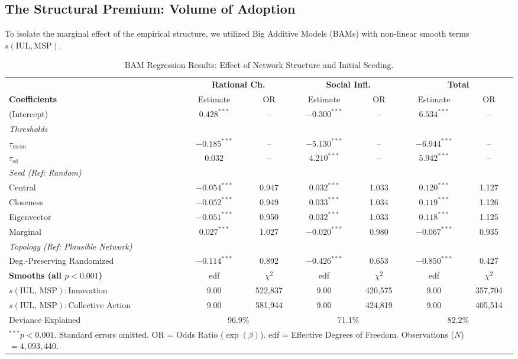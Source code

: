 \documentclass[5p,twocolumn,authoryear]{elsarticle}
\begin{document}
\subsection{The Structural Premium: Volume of Adoption}
To isolate the marginal effect of the empirical structure, we utilized Big Additive Models (BAMs) with non-linear smooth terms $s(\text{IUL}, \text{MSP})$.

\begin{table}[t]
    \centering
    \caption{BAM Regression Results: Effect of Network Structure and Initial Seeding.}
    \label{tab:bam}
    \begin{tabular}{lcccccc}
    \toprule
    & \multicolumn{2}{c}{\textbf{Rational Ch.}} & \multicolumn{2}{c}{\textbf{Social Infl.}} & \multicolumn{2}{c}{\textbf{Total}} \\
    \cmidrule(lr){2-3} \cmidrule(lr){4-5} \cmidrule(lr){6-7}
    \textbf{Coefficients} & Estimate & OR & Estimate & OR & Estimate & OR \\
    \midrule
    (Intercept) & $0.428^{***}$ & -- & $-0.300^{***}$ & -- & $6.534^{***}$ & -- \\
    \addlinespace
    \textit{Thresholds} \\
    $\tau_{\text{mean}}$ & $-0.185^{***}$ & -- & $-5.130^{***}$ & -- & $-6.944^{***}$ & -- \\
    $\tau_{\text{sd}}$ & $0.032$ & -- & $4.210^{***}$ & -- & $5.942^{***}$ & -- \\
    \addlinespace
    \textit{Seed (Ref: Random)} \\
    Central & $-0.054^{***}$ & 0.947 & $0.032^{***}$ & 1.033 & $0.120^{***}$ & 1.127 \\
    Closeness & $-0.052^{***}$ & 0.949 & $0.033^{***}$ & 1.034 & $0.119^{***}$ & 1.126 \\
    Eigenvector & $-0.051^{***}$ & 0.950 & $0.032^{***}$ & 1.033 & $0.118^{***}$ & 1.125 \\
    Marginal & $0.027^{***}$ & 1.027 & $-0.020^{***}$ & 0.980 & $-0.067^{***}$ & 0.935 \\
    \addlinespace
    \textit{Topology (Ref: Plausible Network)} \\
    Deg.-Preserving Randomized & $-0.114^{***}$ & 0.892 & $-0.426^{***}$ & 0.653 & $\mathbf{-0.850}^{***}$ & 0.427 \\
    \midrule
    \textbf{Smooths (all $p < 0.001$)} & edf & $\chi^2$ & edf & $\chi^2$ & edf & $\chi^2$ \\
    \midrule
    $s(\text{IUL, MSP}):\text{Innovation}$ & 9.00 & 522,837 & 9.00 & 420,575 & 9.00 & 357,704 \\
    $s(\text{IUL, MSP}):\text{Collective Action}$ & 9.00 & 581,944 & 9.00 & 424,819 & 9.00 & 405,514 \\
    \midrule
    Deviance Explained & \multicolumn{2}{c}{96.9\%} & \multicolumn{2}{c}{71.1\%} & \multicolumn{2}{c}{82.2\%} \\
    \bottomrule
    \multicolumn{7}{l}{\footnotesize $^{***} p < 0.001$. Standard errors omitted. OR = Odds Ratio ($\exp(\beta)$). edf = Effective Degrees of Freedom. Observations ($N$) $= 4,093,440$.}
    \end{tabular}
\end{table}
\end{document}
